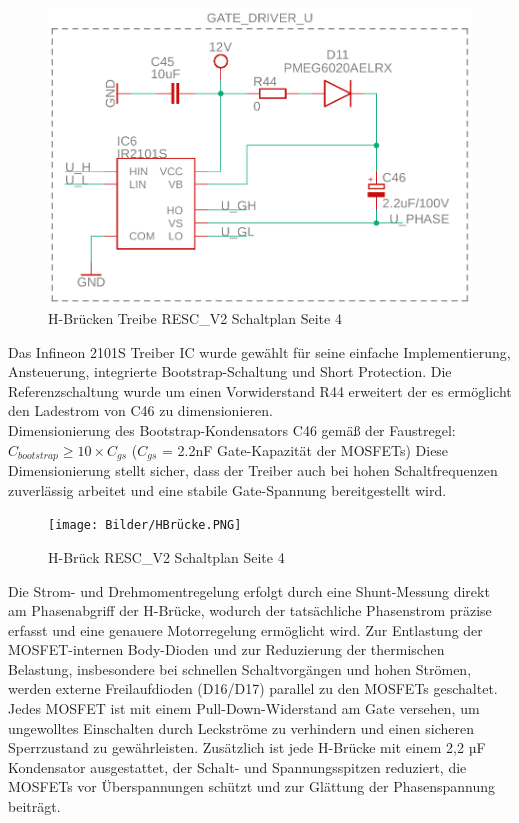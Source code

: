 \documentclass[paper=a4,11pt]{scrreprt}
\begin{document}
\begin{figure}[ht]
\begin{center}
\includegraphics[width=12cm]{Bilder/BLDCDriver.PNG}
\caption{H-Brücken Treibe RESC\_V2 Schaltplan Seite 4}
\label{GateDriver}
\end{center}
\end{figure}

Das Infineon 2101S Treiber IC wurde gewählt für seine einfache Implementierung, Ansteuerung, integrierte Bootstrap-Schaltung und Short Protection. Die Referenzschaltung wurde um einen Vorwiderstand R44 erweitert der es ermöglicht den Ladestrom von C46 zu dimensionieren. \\
Dimensionierung des Bootstrap-Kondensators C46 gemäß der Faustregel:\\ $C_{bootstrap}\geq10\times C_{gs}$ ($C_{gs}$ = 2.2nF Gate-Kapazität der MOSFETs)
Diese Dimensionierung stellt sicher, dass der Treiber auch bei hohen Schaltfrequenzen zuverlässig arbeitet und eine stabile Gate-Spannung bereitgestellt wird.
\newpage

\begin{figure}[ht]
\begin{center}
\texttt{[image: Bilder/HBrücke.PNG]}
\caption{H-Brück RESC\_V2 Schaltplan Seite 4}
\label{HBridge}
\end{center}
\end{figure}

Die Strom- und Drehmomentregelung erfolgt durch eine Shunt-Messung direkt am Phasenabgriff der H-Brücke, wodurch der tatsächliche Phasenstrom präzise erfasst und eine genauere Motorregelung ermöglicht wird. Zur Entlastung der MOSFET-internen Body-Dioden und zur Reduzierung der thermischen Belastung, insbesondere bei schnellen Schaltvorgängen und hohen Strömen, werden externe Freilaufdioden (D16/D17) parallel zu den MOSFETs geschaltet. Jedes MOSFET ist mit einem Pull-Down-Widerstand am Gate versehen, um ungewolltes Einschalten durch Leckströme zu verhindern und einen sicheren Sperrzustand zu gewährleisten. Zusätzlich ist jede H-Brücke mit einem 2,2 µF Kondensator ausgestattet, der Schalt- und Spannungsspitzen reduziert, die MOSFETs vor Überspannungen schützt und zur Glättung der Phasenspannung beiträgt.
\newpage
\end{document}
